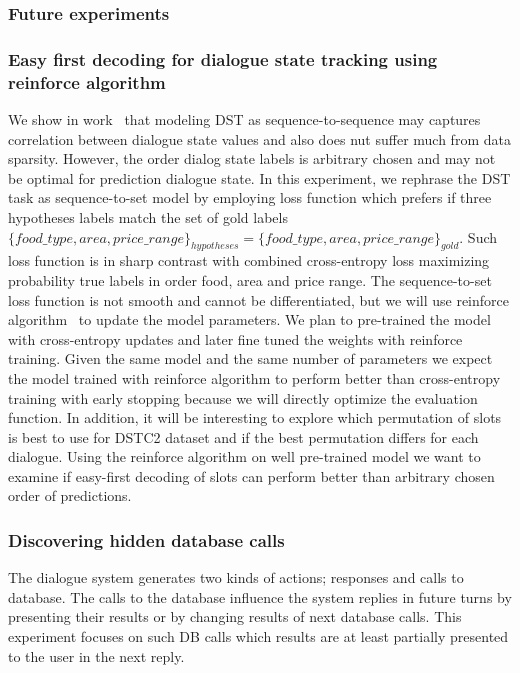 \documentclass[11pt]{article}
\begin{document}
\subsubsection*{Future experiments}

\subsubsection*{Easy first decoding for dialogue state tracking using reinforce algorithm}
We show in work~\cite{platek_recurrent_2016} that modeling DST as sequence-to-sequence may captures correlation between dialogue state values and also does nut suffer much from data sparsity.
However, the order dialog state labels is arbitrary chosen and may not be optimal for prediction dialogue state.
In this experiment, we rephrase the DST task as sequence-to-set model by employing loss function which prefers if three hypotheses labels match the set of gold labels $\{food\_type, area, price\_range\}_{hypotheses} = \{food\_type, area, price\_range\}_{gold}$.
Such loss function is in sharp contrast with combined cross-entropy loss maximizing probability true labels in order food, area and price range.
The sequence-to-set loss function is not smooth and cannot be differentiated, but we will use reinforce algorithm~\cite{williams_simple_1992} to update the model parameters.
We plan to pre-trained the model with cross-entropy updates and later fine tuned the weights with reinforce training.
Given the same model and the same number of parameters we expect the model trained with reinforce algorithm to perform better than cross-entropy training with early stopping because we will directly optimize the evaluation function.
In addition, it will be interesting to explore which permutation of slots is best to use for DSTC2 dataset and if the best permutation differs for each dialogue.
Using the reinforce algorithm on well pre-trained model we want to examine if easy-first decoding of slots can perform better than arbitrary chosen order of predictions. 

\subsubsection*{Discovering hidden database calls}
The dialogue system generates two kinds of actions; responses and calls to database.
The calls to the database influence the system replies in future turns by presenting their results or by changing results of next database calls.
This experiment focuses on such DB calls which results are at least partially presented to the user in the next reply.
\end{document}
